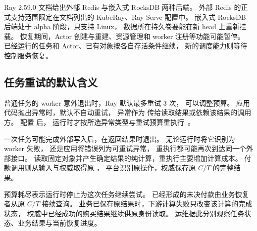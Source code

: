 Ray 2.59.0 文档给出外部 Redis 与嵌入式 RocksDB 两种后端。
外部 Redis 的正式支持范围限定在文档列出的 KubeRay、Ray Serve 配置中。
嵌入式 RocksDB 后端处于 alpha 阶段，只支持 Linux，
数据所在持久卷要能在新 head 上重新挂载。
恢复期间，Actor 创建与重建、资源管理和 worker 注册等功能可能暂停。
已经运行的任务和 Actor、已有对象按各自存活条件继续，
新的调度能力则等待控制服务恢复。

\subsection{任务重试的默认含义}

普通任务的 worker 意外退出时，Ray 默认最多重试 3 次，
 可以调整预算。
应用代码抛出异常时，默认不自动重试，
异常作为  传给读取结果或依赖该结果的调用方。
配置  后，
运行时才按所选异常类型与重试预算重执行~\cite{ray259-task-retry}。

一次任务可能完成外部写入后，在返回结果时退出。
无论运行时将它识别为 worker 失败，
还是应用将错误列为可重试异常，
重执行都可能再次到达同一个外部接口。
读取固定对象并产生确定结果的纯计算，重执行主要增加计算成本。
付款调用则从输入与权威取得原 ，
平台识别原操作，权威保存原 $C/T$ 的完整结果。

预算耗尽表示运行时停止为这次任务继续尝试。
已经形成的未决付款由业务恢复者从原 $C/T$ 接续查询。
业务已保存原结果时，下游计算失败只改变该计算的完成状态，
权威中已经成功的购买结果继续供原身份读取。
运维据此分别观察任务状态、业务结果与当前恢复进度。
